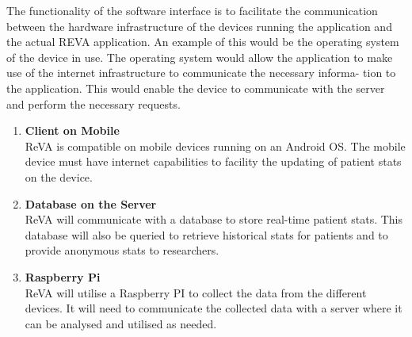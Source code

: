 The functionality of the software interface is to facilitate the communication
between the hardware infrastructure of the devices running the application and
the actual REVA application. An example of this would be the operating system
 of the device in use. The operating system would allow the application to
make use of the internet infrastructure to communicate the necessary informa-
tion to the application. This would enable the device to communicate with the
server and perform the necessary requests.

\begin{enumerate}


\item{\textbf{Client on Mobile} \\
ReVA is compatible on mobile devices running on an Android
OS. The mobile device must have internet capabilities to facility the updating of patient stats on the device.}
\item{\textbf{Database on the Server} \\
ReVA will communicate with a database to store real-time patient stats. This database will also be queried to retrieve historical stats for patients and to provide anonymous stats to researchers.}
\item{\textbf{Raspberry Pi} \\
ReVA will utilise a Raspberry PI to collect the data from the different devices. It will need to communicate the collected data with a server where it can be analysed and utilised as needed.}

\end{enumerate}
